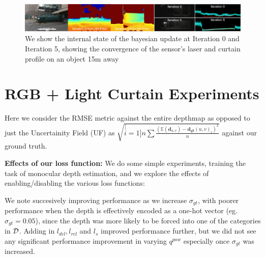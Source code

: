\begin{figure}[h!]
   \includegraphics[width=1.0\textwidth]{figures/p6.png}
   \caption{We show the internal state of the bayesian update at Iteration 0 and Iteration 5, showing the convergence of the sensor's laser and curtain profile on an object 15m away}  
   \label{fig:images4} 
\end{figure}

\section{RGB + Light Curtain Experiments} 

Here we consider the RMSE metric against the entire depthmap as opposed to just the Uncertainity Field (UF) as $\sqrt{\stackrel[i=1]{n}{\sum}\frac{\left(\mathbb{E}\left(\mathbf{d}_{u,v}\right)-\mathbf{d_{gt}}(u,v)_{i}\right)^{2}}{n}}$ against our ground truth.

\textbf{Effects of our loss function:} We do some simple experiments, training the task of monocular depth estimation, and we explore the effects of enabling/disabling the various loss functions:
\noindent
\begin{table}[h]
   \centering
   \caption{Effects of various loss functions for the baseline of Monocular Depth Estimation only}
   \label{table:xx}
\end{table}

We note succesively improving performance as we increase $\sigma_{gt}$, with poorer performance when the depth is effectively encoded as a one-hot vector (eg. $\sigma_{gt}=0.05$), since the depth was more likely to be forced into one of the categories in $\mathcal{D}$. Adding in $l_{dcl}, l_{rcl}$ and $l_{s}$ improved performance further, but we did not see any significant performance improvement in varying $q^{pow}$ especially once $\sigma_{gt}$ was increased.

